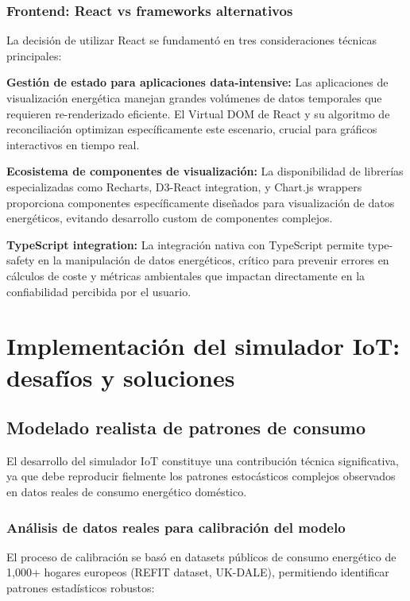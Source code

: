 \subsubsection{Frontend: React vs frameworks alternativos}

La decisión de utilizar React se fundamentó en tres consideraciones técnicas principales:

\textbf{Gestión de estado para aplicaciones data-intensive:}
Las aplicaciones de visualización energética manejan grandes volúmenes de datos temporales que requieren re-renderizado eficiente. El Virtual DOM de React y su algoritmo de reconciliación optimizan específicamente este escenario, crucial para gráficos interactivos en tiempo real.

\textbf{Ecosistema de componentes de visualización:}
La disponibilidad de librerías especializadas como Recharts, D3-React integration, y Chart.js wrappers proporciona componentes específicamente diseñados para visualización de datos energéticos, evitando desarrollo custom de componentes complejos.

\textbf{TypeScript integration:}
La integración nativa con TypeScript permite type-safety en la manipulación de datos energéticos, crítico para prevenir errores en cálculos de coste y métricas ambientales que impactan directamente en la confiabilidad percibida por el usuario.

\section{Implementación del simulador IoT: desafíos y soluciones}

\subsection{Modelado realista de patrones de consumo}

El desarrollo del simulador IoT constituye una contribución técnica significativa, ya que debe reproducir fielmente los patrones estocásticos complejos observados en datos reales de consumo energético doméstico.

\subsubsection{Análisis de datos reales para calibración del modelo}

El proceso de calibración se basó en datasets públicos de consumo energético de 1,000+ hogares europeos (REFIT dataset, UK-DALE), permitiendo identificar patrones estadísticos robustos:

